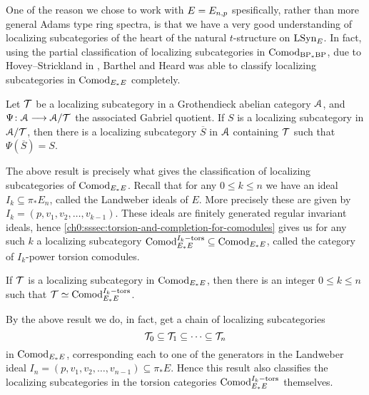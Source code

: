 One of the reason we chose to work with $E=E_{n,p}$ spesifically, rather than more general Adams type ring spectra, is that we have a very good understanding of localizing subcategories of the heart of the natural $t$-structure on $\mathrm{LSyn}_{E}$. In fact, using the partial classification of localizing subcategories in $\mathrm{Comod}_{\mathrm{BP}_*\mathrm{BP}}$, due to Hovey--Strickland in \cite{hovey-strickland_2005a}, Barthel and Heard was able to classify localizing subcategories in $\mathrm{Comod}_{E_*E}$ completely. 

\begin{proposition}
    Let $\mathcal{T}$ be a localizing subcategory in a Grothendieck abelian category $\EuScript{A}$, and $\Psi\colon\EuScript{A}\longrightarrow \EuScript{A}/\mathcal{T}$ the associated Gabriel quotient. If $S$ is a localizing subcategory in $\EuScript{A}/\mathcal{T}$, then there is a localizing subcategory $\overline{S}$ in $\EuScript{A}$ containing $\mathcal{T}$ such that $\Psi(\overline{S})=S$. 
\end{proposition}

The above result is precisely what gives the classification of localizing subcategories of $\mathrm{Comod}_{E_*E}$. Recall that for any $0\leq k\leq n$ we have an ideal $I_k \subseteq \pi_* E_n$, called the Landweber ideals of $E$. More precisely these are given by $I_k = (p, v_1, v_2, \ldots, v_{k-1})$. These ideals are finitely generated regular invariant ideals, hence \cref{ch0:sssec:torsion-and-completion-for-comodules} gives us for any such $k$ a localizing subcategory $\mathrm{Comod}_{E_*E}^{I_k-\mathrm{tors}}\subseteq \mathrm{Comod}_{E_*E}$, called the category of $I_k$-power torsion comodules. 

\begin{theorem}
    \label{ch3:add:thm:classification-of-abelian-localizing}
    If $\mathcal{T}$ is a localizing subcategory in $\mathrm{Comod}_{E_*E}$, then there is an integer $0\leq k\leq n$ such that $\mathcal{T} \simeq \mathrm{Comod}_{E_*E}^{I_k-\mathrm{tors}}$. 
\end{theorem}

\begin{remark}
    By the above result we do, in fact, get a chain of localizing subcategories
    \[\mathcal{T}_0 \subseteq \mathcal{T}_1\subseteq \cdots \subseteq \mathcal{T}_n \]
    in $\mathrm{Comod}_{E_*E}$, corresponding each to one of the generators in the Landweber ideal $I_n=(p, v_1, v_2, \ldots, v_{n-1})\subseteq \pi_* E$. Hence this result also classifies the localizing subcategories in the torsion categories $\mathrm{Comod}_{E_*E}^{I_k-\mathrm{tors}}$ themselves.  
\end{remark}

